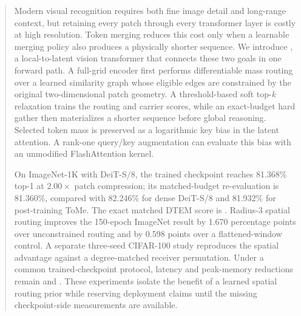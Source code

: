 \begin{abstract}
Modern visual recognition requires both fine image detail and long-range
context, but retaining every patch through every transformer layer is costly
at high resolution. Token merging reduces this cost only when a learnable
merging policy also produces a physically shorter sequence. We introduce
\mn{}, a local-to-latent vision transformer that connects these two goals in
one forward path. A full-grid encoder first performs differentiable mass
routing over a learned similarity graph whose eligible edges are constrained
by the original two-dimensional patch geometry. A threshold-based soft
top-$k$ relaxation trains the routing and carrier scores, while an exact-budget
hard gather then materializes a shorter sequence before global reasoning.
Selected token mass is preserved as a logarithmic key bias in the latent
attention. A rank-one query/key augmentation can evaluate this bias with an
unmodified FlashAttention kernel.

On ImageNet-1K with DeiT-S/8, the trained \mn{} checkpoint reaches
81.368\% top-1 at $2.00\times$ patch compression; its matched-budget
re-evaluation is 81.360\%, compared with 82.246\% for dense DeiT-S/8 and
81.932\% for post-training ToMe. The exact matched DTEM score is
. Radius-3 spatial routing improves the 150-epoch
ImageNet result by 1.670 percentage points over unconstrained routing and by
0.598 points over a flattened-window control. A separate three-seed
CIFAR-100 study reproduces the spatial advantage against a degree-matched
receiver permutation. Under a common trained-checkpoint
protocol, latency and peak-memory reductions remain
 and . These experiments isolate
the benefit of a learned spatial routing prior while reserving deployment
claims until the missing checkpoint-side measurements are available.
\end{abstract}
